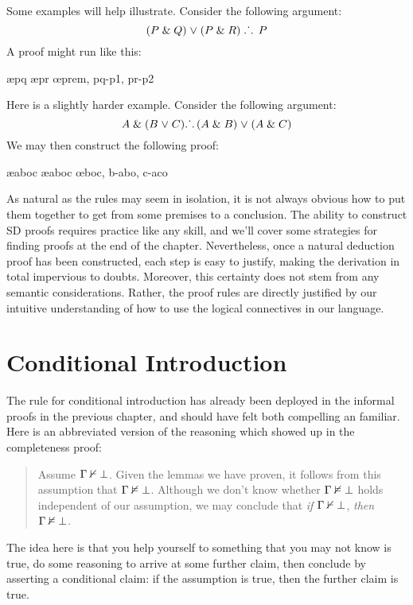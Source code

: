 Some examples will help illustrate.
Consider the following argument:
$$(P \mathrel\& Q) \mkern1mu\vee\mkern1mu (P \mathrel\& R) \; \ldotp\dot{}\,\ldotp \; P$$
A proof might run like this:
	\begin{fitchproof}
		 \pr{}
			\open
				 
				\ae{pq}
			\close
			\open
				 
				\ae{pr}
			\close
		\oe{prem, pq-p1, pr-p2}
	\end{fitchproof}
Here is a slightly harder example.
Consider the following argument:
	$$ A \mathrel\& (B \mkern1mu\vee\mkern1mu C) \ldotp\dot{}\,\ldotp (A \mathrel\& B) \mkern1mu\vee\mkern1mu (A \mathrel\& C)$$
We may then construct the following proof:
	\begin{fitchproof}
		 \pr{}
		\ae{aboc}
		\ae{aboc}
		\open
			 \as{for \eor E}
			\ai{a,b}
			\have{abo}{(A \eand B) \eor (A \eand C)}\oi{ab}
		\close
		\open
			 \as{for \eor E}
			\ai{a,c}
			\have{aco}{(A \eand B) \eor (A \eand C)}\oi{ac}
		\close
	\oe{boc, b-abo, c-aco}
	\end{fitchproof}
As natural as the rules may seem in isolation, it is not always obvious how to put them together to get from some premises to a conclusion.
The ability to construct SD proofs requires practice like any skill, and we'll cover some strategies for finding proofs at the end of the chapter.
Nevertheless, once a natural deduction proof has been constructed, each step is easy to justify, making the derivation in total impervious to doubts.
Moreover, this certainty does not stem from any semantic considerations.
Rather, the proof rules are directly justified by our intuitive understanding of how to use the logical connectives in our language.




\section{Conditional Introduction}

The rule for conditional introduction has already been deployed in the informal proofs in the previous chapter, and should have felt both compelling an familiar.
Here is an abbreviated version of the reasoning which showed up in the completeness proof:
	\begin{quote}
		Assume $\Gamma \nvdash \bot$.
    Given the lemmas we have proven, it follows from this assumption that $\Gamma \nvDash \bot$.
    Although we don't know whether $\Gamma \nvDash \bot$ holds independent of our assumption, we may conclude that \textit{if} $\Gamma \nvdash \bot$, \textit{then} $\Gamma \nvDash \bot$. 
	\end{quote}
The idea here is that you help yourself to something that you may not know is true, do some reasoning to arrive at some further claim, then conclude by asserting a conditional claim: if the assumption is true, then the further claim is true.

